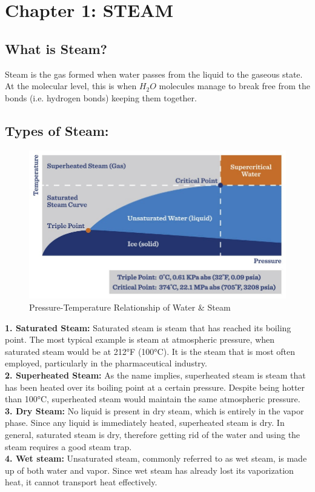 
\section{Chapter 1: STEAM}
\subsection{What is Steam?}
Steam is the gas formed when water passes from the liquid to the gaseous state.
At the molecular level, this is when $H_2O$ molecules manage to break free from the bonds 
(i.e. hydrogen bonds) keeping them together\cite{what_is_steam}\relax.


\subsection{Types of Steam:}

\begin{figure}[h!]
    \centering
    \includegraphics[width=\linewidth]{figs/steam.jpg}
    \caption{Pressure-Temperature Relationship of Water \& Steam}
    \label{fig:webimage}
\end{figure}
\textbf{1. Saturated Steam:} Saturated steam is steam that has reached its boiling point. 
The most typical example is steam at atmospheric pressure, when saturated steam would be at 212°F (100°C). 
It is the steam that is most often employed, particularly in the pharmaceutical industry.\\
\textbf{2.	Superheated Steam:} As the name implies, superheated steam is steam that has been heated over its boiling point at a certain pressure.
Despite being hotter than 100°C, superheated steam would maintain the same atmospheric pressure. \\
\textbf{3.	Dry Steam:} No liquid is present in dry steam, which is entirely in the vapor phase. Since any liquid is immediately heated, superheated steam is dry.
In general, saturated steam is dry, therefore getting rid of the water and using the steam requires a good steam trap. \\
\textbf{4.	Wet steam:} Unsaturated steam, commonly referred to as wet steam, is made up of both water and vapor.
Since wet steam has already lost its vaporization heat, it cannot transport heat effectively. 

